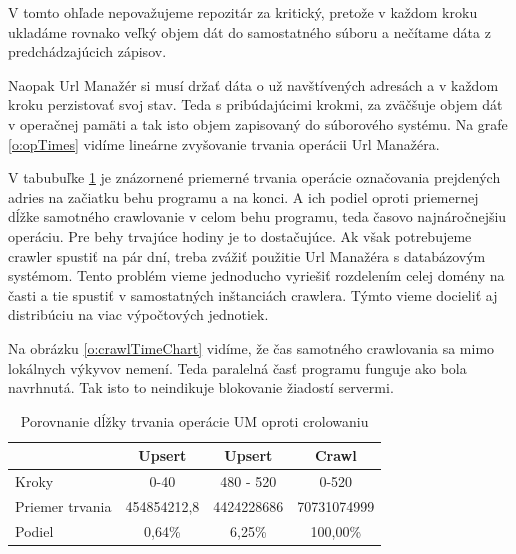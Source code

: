 V tomto ohľade nepovažujeme repozitár za kritický, pretože v každom kroku ukladáme rovnako veľký objem dát do samostatného súboru a nečítame dáta z predchádzajúcich zápisov.

Naopak Url Manažér si musí držať dáta o už navštívených adresách a v každom kroku perzistovať svoj stav. Teda s pribúdajúcimi krokmi, za zväčšuje objem dát v operačnej pamäti a tak isto objem zapisovaný do súborového systému. Na grafe \ref{o:opTimes} vidíme lineárne zvyšovanie trvania operácii Url Manažéra. 

V tabubuľke \ref{t:degr} je znázornené priemerné trvania operácie označovania prejdených adries  na začiatku behu programu a na konci. A ich podiel oproti priemernej dĺžke samotného crawlovanie v celom behu programu, teda časovo najnáročnejšiu operáciu. Pre behy trvajúce hodiny je to dostačujúce. Ak však potrebujeme crawler spustiť na pár dní, treba zvážiť použitie Url Manažéra s databázovým systémom. Tento problém vieme jednoducho vyriešiť rozdelením celej domény na časti a tie spustiť v samostatných inštanciách crawlera. Týmto vieme docieliť aj distribúciu na viac výpočtových jednotiek. 

Na obrázku \ref{o:crawlTimeChart} vidíme, že čas samotného crawlovania sa mimo lokálnych výkyvov nemení. Teda paralelná časť programu funguje ako bola navrhnutá. Tak isto to neindikuje blokovanie žiadostí servermi. 


\begin{table}[!ht]
	\caption{Porovnanie dĺžky trvania operácie UM oproti crolowaniu}\label{t:degr}
	\smallskip
	\centering
    \begin{tabular}{|l|c|c|c|}
    \hline
          & Upsert & Upsert & Crawl \\ \hline
        Kroky & 0-40 & 480 - 520 & 0-520 \\ \hline
        Priemer trvania & 454854212,8 & 4424228686 & 70731074999 \\ \hline
        Podiel & 0,64\% & 6,25\% & 100,00\% \\ \hline
    \end{tabular}
\end{table}


